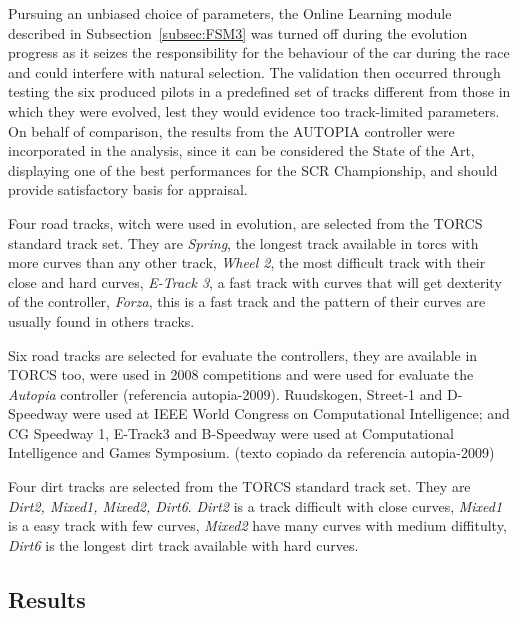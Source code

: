 	Pursuing an unbiased choice of parameters, the Online Learning module described in Subsection~\ref{subsec:FSM3}
	was turned off during the evolution progress as it seizes the responsibility for the behaviour of the car during
	the race and could interfere with natural selection. The validation then occurred through testing the six produced
	pilots in a predefined set of tracks different from those in which they were evolved, lest they would evidence
	too track-limited parameters. On behalf of comparison, the results from the AUTOPIA controller were incorporated
	in the analysis, since it can be considered the State of the Art, displaying one of the best performances for the
	SCR Championship, and should provide satisfactory basis for appraisal.

	Four road tracks, witch were used in evolution, are selected from the TORCS standard track set. They are \emph{Spring}, 
	the longest track available in torcs with more curves than any other track, \emph{Wheel 2}, the most difficult track 
	with their close and hard curves, \emph{E-Track 3}, a fast track with curves that will get dexterity of the controller, 
	\emph{Forza}, this is a fast track and the pattern of their curves are usually found in others tracks.

	Six road tracks are selected for evaluate the controllers, they are available in TORCS too, were used in 2008 competitions 
	and were used for evaluate the \emph{Autopia} controller (referencia autopia-2009). Ruudskogen, Street-1 and D-Speedway were 
	used at IEEE World Congress on Computational Intelligence; and CG Speedway 1, E-Track3 and B-Speedway were used 
	at Computational Intelligence and Games Symposium. (texto copiado da referencia autopia-2009)

	Four dirt tracks are selected from the TORCS standard track set. They are \emph{Dirt2, Mixed1, Mixed2, Dirt6}. 
	\emph{Dirt2} is a track difficult with close curves, \emph{Mixed1} is a easy track with few curves, \emph{Mixed2} have many 
	curves with medium diffitulty, \emph{Dirt6} is the longest dirt track available with hard curves.
	
\subsection{Results} \label{subsec:Results}
	
	
